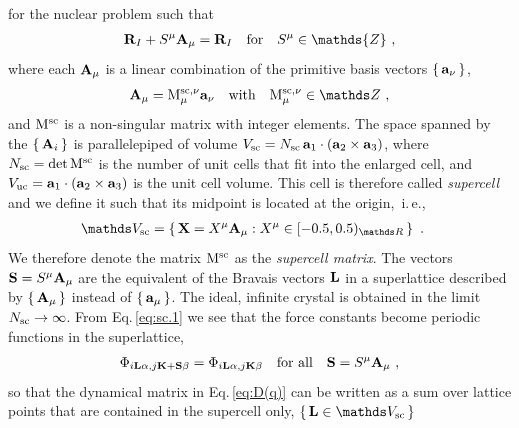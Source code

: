  for the nuclear problem such that
\begin{align}
	\b R_I + S^\mu \b A_\mu = \b R_I \quad\text{for}\quad S^\mu \in \mathds{Z}~,
	\label{eq:sc.1}
\end{align}
where each ${\bf A}_\mu$ is a linear combination of the primitive basis vectors $\set{{\bf a}_\nu}$,
\begin{align}
{\bf A}_\mu = {\rm M}_{\mu}^{{\rm sc}, \nu} {\bf a}_\nu\quad\text{with}\quad {\rm M}_{\mu}^{{\rm sc}, \nu} \in \mathds Z~,
\end{align}
and $\rm M^{\rm sc}$ is a non-singular matrix with integer elements. The space spanned by the $\set{{\bf A}_i}$ is parallelepiped of volume $V_{\rm sc} = N_{\rm sc} \, {\bf a}_1 \cdot ({\bf a}_2 \times {\bf a}_3)$, where $N_{\rm sc} = \det {\rm M}^{\rm sc}$ is the number of unit cells that fit into the enlarged cell, and $V_{\rm uc} = {\bf a}_1 \cdot ({\bf a}_2 \times {\bf a}_3)$ is the unit cell volume. This cell is therefore called \emph{supercell} and we define it such that its midpoint is located at the origin,~i.\,e.,~
\begin{align}
	\mathds V_{\rm sc}
		&= \set{{\bf X} = X^\mu {\bf A}_\mu : X^\mu \in {[-0.5, 0.5)_{\mathds R}}}~.
	\label{eq:supercell}
\end{align}
We therefore denote the matrix ${\rm M}^{\rm sc}$ as the \emph{supercell matrix}.
The vectors \mbox{${\bf S} = S^\mu {\bf A}_\mu$} are the equivalent of the Bravais vectors ${\bf L}$ in a superlattice described by $\set{ {\bf A}_\mu }$ instead of $\set{ {\bf a}_\mu}$.
The ideal, infinite crystal is obtained in the limit $N_{\rm sc} \rightarrow \infty$.
From Eq.\,\eqref{eq:sc.1} we see that the force constants become periodic functions in the superlattice,
\begin{align}
	\Phi_{i {\bf L} \alpha, j {\bf K} + \b S \beta} 
		= \Phi_{i {\bf L} \alpha, j {\bf K} \beta} \quad\text{for all}\quad \b S = S^\mu \b A_\mu~,
	\label{eq:fc.sym.2}
\end{align}
so that the dynamical matrix in Eq.\,\eqref{eq:D(q)} can be written as a sum over lattice points that are contained in the supercell only, $\set{\b L \in \mathds V_{\rm sc}}$
